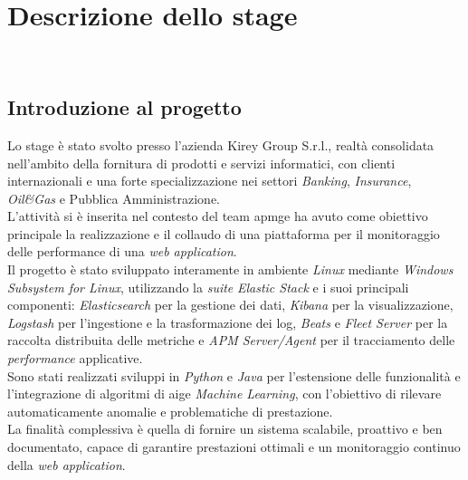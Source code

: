 \chapter{Descrizione dello stage}
\label{cap:descrizione-stage}

\\

\section{Introduzione al progetto}
Lo stage è stato svolto presso l'azienda Kirey Group S.r.l., realtà consolidata nell'ambito della fornitura di prodotti e servizi informatici, con clienti internazionali e una forte specializzazione nei settori \emph{Banking}, \emph{Insurance}, \emph{Oil\&Gas} e Pubblica Amministrazione. \\ 
L'attività si è inserita nel contesto del team \gls{apmg}\glsfirstoccur e ha avuto come obiettivo principale la realizzazione e il collaudo di una piattaforma per il monitoraggio delle performance di una \emph{web application}. \\
Il progetto è stato sviluppato interamente in ambiente \emph{Linux} mediante \emph{Windows Subsystem for Linux}, utilizzando la \emph{suite} \emph{Elastic Stack} e i suoi principali componenti: \emph{Elasticsearch} per la gestione dei dati, \emph{Kibana} per la visualizzazione, \emph{Logstash} per l'ingestione e la trasformazione dei log, \emph{Beats} e \emph{Fleet Server} per la raccolta distribuita delle metriche e \emph{APM Server/Agent} per il tracciamento delle \emph{performance} applicative. \\ 
Sono stati realizzati sviluppi in \emph{Python} e \emph{Java} per l'estensione delle funzionalità e l'integrazione di algoritmi di \gls{aig}\glsfirstoccur e \emph{Machine Learning}, con l'obiettivo di rilevare automaticamente anomalie e problematiche di prestazione. \\   
La finalità complessiva è quella di fornire un sistema scalabile, proattivo e ben documentato, capace di garantire prestazioni ottimali e un monitoraggio continuo della \emph{web application}.  


